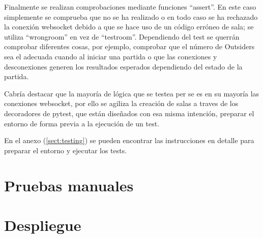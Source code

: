 Finalmente se realizan comprobaciones mediante funciones ``assert''. En este caso simplemente se comprueba que no se ha realizado
o en todo caso se ha rechazado la conexión websocket debido a que se hace uso de un código erróneo de sala; se utiliza ``wrong\textunderscore room''
en vez de ``test\textunderscore room''. Dependiendo del test se querrán comprobar diferentes cosas, por ejemplo, comprobar que el número de Outsiders sea
el adecuada cuando al iniciar una partida o que las conexiones y desconexiones generen los resultados esperados dependiendo del estado de la partida.

Cabría destacar que la mayoría de lógica que se testea per se es en su mayoría las conexiones websocket, por ello se agiliza la creación de salas
a traves de los decoradores de pytest, que están diseñados con esa misma intención, preparar el entorno de forma previa a la ejecución de 
un test. 

En el anexo (\ref{sect:testing}) se pueden encontrar las instrucciones en detalle para preparar el entorno y ejecutar los tests.

\section{Pruebas manuales}

\section{Despliegue}



